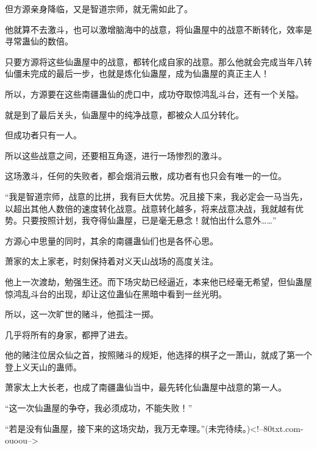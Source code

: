 \begin{this_body}
但方源亲身降临，又是智道宗师，就无需如此了。

他就算不去激斗，也可以激增脑海中的战意，将仙蛊屋中的战意不断转化，效率是寻常蛊仙的数倍。

只要方源将这些仙蛊屋中的战意，都转化成自家的战意。那么他就会完成当年八转仙僵未完成的最后一步，也就是炼化仙蛊屋，成为仙蛊屋的真正主人！

所以，方源要在这些南疆蛊仙的虎口中，成功夺取惊鸿乱斗台，还有一个关隘。

就是到了最后关头，仙蛊屋中的纯净战意，都被众人瓜分转化。

但成功者只有一人。

所以这些战意之间，还要相互角逐，进行一场惨烈的激斗。

这场激斗，任何的失败者，都会烟消云散，成功者有也只会有唯一的一位。

“我是智道宗师，战意的比拼，我有巨大优势。况且接下来，我必定会一马当先，以超出其他人数倍的速度转化战意。战意转化越多，将来战意决战，我就越有优势。只要按照计划，我夺得仙蛊屋，已是毫无悬念！就怕出什么意外……”

方源心中思量的同时，其余的南疆蛊仙们也是各怀心思。

萧家的太上家老，时刻保持着对义天山战场的高度关注。

他上一次渡劫，勉强生还。而下场灾劫已经逼近，本来他已经毫无希望，但仙蛊屋惊鸿乱斗台的出现，却让这位蛊仙在黑暗中看到一丝光明。

所以，这一次旷世的赌斗，他孤注一掷。

几乎将所有的身家，都押了进去。

他的赌注位居众仙之首，按照赌斗的规矩，他选择的棋子之一萧山，就成了第一个登上义天山的蛊师。

萧家太上大长老，也成了南疆蛊仙当中，最先转化仙蛊屋中战意的第一人。

“这一次仙蛊屋的争夺，我必须成功，不能失败！”

“若是没有仙蛊屋，接下来的这场灾劫，我万无幸理。”(未完待续。)<!--80txt.com-ouoou-->

\end{this_body}

